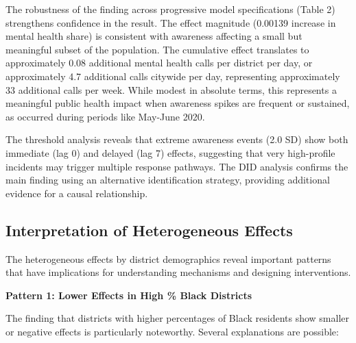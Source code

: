 \documentclass[11pt,a4paper]{article}
\begin{document}
The robustness of the finding across progressive model specifications (Table 2) strengthens confidence in the result. The effect magnitude (0.00139 increase in mental health share) is consistent with awareness affecting a small but meaningful subset of the population. The cumulative effect translates to approximately 0.08 additional mental health calls per district per day, or approximately 4.7 additional calls citywide per day, representing approximately 33 additional calls per week. While modest in absolute terms, this represents a meaningful public health impact when awareness spikes are frequent or sustained, as occurred during periods like May-June 2020.

The threshold analysis reveals that extreme awareness events (2.0 SD) show both immediate (lag 0) and delayed (lag 7) effects, suggesting that very high-profile incidents may trigger multiple response pathways. The DID analysis confirms the main finding using an alternative identification strategy, providing additional evidence for a causal relationship.

\subsection{Interpretation of Heterogeneous Effects}

The heterogeneous effects by district demographics reveal important patterns that have implications for understanding mechanisms and designing interventions.

\textbf{Pattern 1: Lower Effects in High \% Black Districts}

The finding that districts with higher percentages of Black residents show smaller or negative effects is particularly noteworthy. Several explanations are possible:
\end{document}

